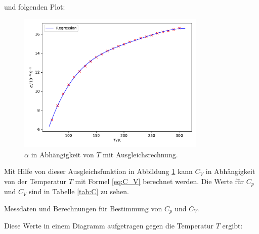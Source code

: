 und folgenden Plot:

\begin{figure}[H]
    \centering
    \includegraphics[width=0.8\textwidth]{build/alpha.pdf}
    \caption{$\alpha$ in Abhängigkeit von $T$ mit Ausgleichsrechnung.}
    \label{fig:alpha_plot}
\end{figure}

Mit Hilfe von dieser Ausgleichsfunktion in Abbildung \ref{fig:alpha_plot} kann $C_V$ in Abhängigkeit von der Temperatur $T$ mit Formel \eqref{eq:C_V} berechnet werden. Die Werte für $C_p$ und $C_V$ sind in Tabelle \ref{tab:C} zu sehen.

\begin{table}
    \centering
    \caption{Messdaten und Berechnungen für Bestimmung von $C_p$ und $C_V$. }
    \label{tab:C}
\end{table}
Diese Werte in einem Diagramm aufgetragen gegen die Temperatur $T$ ergibt:

